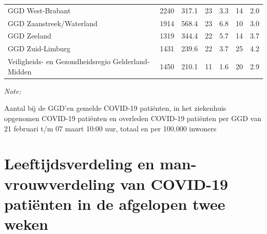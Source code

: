 \documentclass[
  english,
  man,floatsintext]{apa6}
\begin{document}
\begin{table}
\begin{threeparttable}
\begin{tabular}{lrrrrrr}
GGD West-Brabant & 2240 & 317.1 & 23 & 3.3 & 14 & 2.0\\
GGD Zaanstreek/Waterland & 1914 & 568.4 & 23 & 6.8 & 10 & 3.0\\
GGD Zeeland & 1319 & 344.4 & 22 & 5.7 & 14 & 3.7\\
GGD Zuid-Limburg & 1431 & 239.6 & 22 & 3.7 & 25 & 4.2\\
Veiligheids- en Gezondheidsregio Gelderland-Midden & 1450 & 210.1 & 11 & 1.6 & 20 & 2.9\\
\bottomrule
\end{tabular}
\begin{tablenotes}
\item \textit{Note: } 
\item Aantal bij de GGD’en gemelde COVID-19 patiënten, in het ziekenhuis opgenomen COVID-19 patiënten en overleden COVID-19 patiënten per GGD van 21 februari t/m 07 maart 10:00 uur, totaal en per 100.000 inwoners
\end{tablenotes}
\end{threeparttable}
\endgroup{}
\end{table}

\newpage

\hypertarget{leeftijdsverdeling-en-man-vrouwverdeling-van-covid-19-patiuxebnten-in-de-afgelopen-twee-weken}{%
\section{Leeftijdsverdeling en man-vrouwverdeling van COVID-19 patiënten in de afgelopen twee weken}\label{leeftijdsverdeling-en-man-vrouwverdeling-van-covid-19-patiuxebnten-in-de-afgelopen-twee-weken}}
\end{document}
